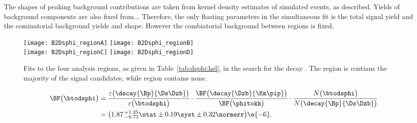 The shapes of peaking background contributions are taken from kernel density
estimates of simulated events, as described.
Yields of background components are also fixed from...
Therefore, the only floating parameters in the simultaneous fit is the total signal yield and the
cominatorial background yields and shape.
However the combiatorial background between regions is fixed.




\begin{figure}
  \begin{center}
    \texttt{[image: B2Dsphi\_regionA]}
    \texttt{[image: B2Dsphi\_regionB]}\\
    \texttt{[image: B2Dsphi\_regionC]}
    \texttt{[image: B2Dsphi\_regionD]}
    \caption{\small
      Fits to the four analysis regions, as given in Table~\ref{tab:dsphi:hel}, in the search for
      the decay \btodsphi.
      The region \rA is contians the majority of the signal candidates, while region \rD contains
      none.
    }
    \label{fig:dsphi:fits}
  \end{center}
\end{figure}









\begin{align}
  \BF\big(\btodsphi\big) &=
  \frac{\varepsilon\big(\decay{\Bp}{\Ds\Dzb}\big)}{\varepsilon\big(\btodsphi\big)}
  \cdot
  \frac{\BF\big(\decay{\Dzb}{\Km\pip}\big)}{\BF\big(\phitokk\big)}
  \cdot
  \frac{N\big(\btodsphi\big)}{N\big(\decay{\Bp}{\Ds\Dzb}\big)} \nonumber\\
  &=\big(1.87\,^{+1.25}_{-0.73}\stat\pm0.19\syst\pm0.32\normerr\big)\e{-6}.
  \label{eq:dsphi:bf}
\end{align}




















